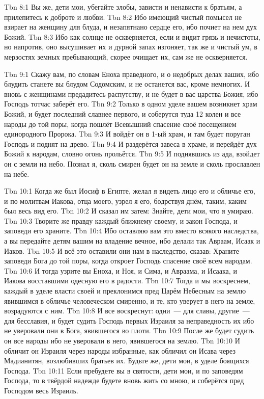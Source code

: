 \vs Tbn 8:1
Вы же, дети мои, убегайте злобы, зависти и ненависти к братьям,
а прилепитесь к доброте и любви.
\vs Tbn 8:2
Ибо имеющий чистый помысел не взирает на женщину для блуда,
и незапятнано сердце его, ибо почиет на нем дух Божий.
\vs Tbn 8:3
Ибо как солнце не оскверняется, если и видит грязь и нечистоты,
но напротив, оно высушивает их и дурной запах изгоняет,
так же и чистый ум, в мерзостях земных пребывающий,
скорее очищает их, сам же не оскверняется.

\vs Tbn 9:1
Скажу вам, по словам Еноха праведного, и о недобрых делах ваших,
ибо блудить станете вы блудом Содомским, и не останется вас,
кроме немногих.
И вновь с женщинами предадитесь распутству,
и не будет в вас царства Божия,
ибо Господь тотчас заберёт его.
\vs Tbn 9:2
Только в одном уделе вашем возникнет храм Божий,
и будет последний славнее первого, и соберутся туда 12 колен
и все народы до той поры, когда пошлёт Всевышний спасение своё
посещением единородного Пророка.
\vs Tbn 9:3
И войдёт он в 1-ый храм, и там будет поруган Господь и поднят на древо.
\vs Tbn 9:4
И раздерётся завеса в храме, и перейдёт дух Божий к народам,
словно огонь прольётся.
\vs Tbn 9:5
И поднявшись из ада, взойдет он с земли на небо.
Познал я, сколь смирен будет он на земле и сколь прославлен на небе.

\vs Tbn 10:1
Когда же был Иосиф в Египте, желал я видеть лицо его и обличье его,
и по молитвам Иакова, отца моего, узрел я его, бодрствуя днём,
таким, каким был весь вид его.
\vs Tbn 10:2
И сказал им затем: Знайте, дети мои, что я умираю.
\vs Tbn 10:3
Творите же правду каждый ближнему своему, и закон Господа,
и заповеди его храните.
\vs Tbn 10:4
Ибо оставляю вам это вместо всякого наследства,
а вы передайте детям вашим на владение вечное,
ибо делали так Авраам, Исаак и Иаков.
\vs Tbn 10:5
И всё это оставили они нам в наследство, сказав:
Храните заповеди Бога до той поры, когда откроет Господь
спасение своё всем народам.
\vs Tbn 10:6
И тогда узрите вы Еноха, и Ноя, и Сима, и Авраама,
и Исаака, и Иакова восставшими одесную его в радости.
\vs Tbn 10:7
Тогда и мы воскреснем, каждый в уделе власти своей
и преклонимся пред Царём Небесным на землю явившимся
в обличье человеческом смиренно, и те, кто уверует
в него на земле, возрадуются с ним.
\vs Tbn 10:8
И все воскреснут: одни~--- для славы, другие~--- для бесславия,
и будет судить Господь первых Израиля за неправедность
их ибо не уверовали они в Бога, явившегося во плоти.
\vs Tbn 10:9
После же будет судить он все народы ибо не уверовали в него,
явившегося на землю.
\vs Tbn 10:10
И обличит он Израиля через народы избранные,
как обличил он Исава через Мадианитян,
возлюбивших братьев их.
Будьте же, дети мои, в уделе боящихся Господа.
\vs Tbn 10:11
Если пребудете вы в святости, дети мои,
и по заповедям Господа, то в твёрдой надежде будете вновь жить со мною,
и соберётся пред Господом весь Израиль.

